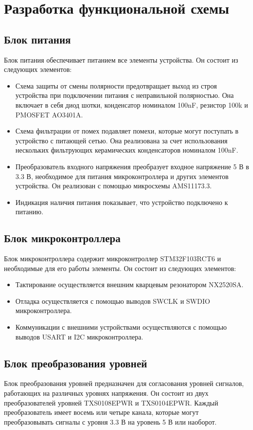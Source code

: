 \section{Разработка функциональной схемы}
\label{sec:func}

\subsection{Блок питания}
Блок питания обеспечивает питанием все элементы устройства. Он состоит из следующих элементов:
\begin{itemize}
    \item Схема защиты от смены полярности предотвращает выход из строя устройства при подключении питания с неправильной полярностью. Она включает в себя диод шотки, конденсатор номиналом 100nF, резистор 100k и PMOSFET AO3401A.
    \item Схема фильтрации от помех подавляет помехи, которые могут поступать в устройство с питающей сетью. Она реализована за счет использования нескольких фильтрующих керамических конденсаторов номиналом 100nF.
    \item Преобразователь входного напряжения преобразует входное напряжение 5 В в 3.3 В, необходимое для питания микроконтроллера и других элементов устройства. Он реализован с помощью микросхемы AMS11173.3.
    \item Индикация наличия питания показывает, что устройство подключено к питанию.
\end{itemize}

\subsection{Блок микроконтроллера}
Блок микроконтроллера содержит микроконтроллер STM32F103RCT6 и необходимые для его работы элементы. Он состоит из следующих элементов:
\begin{itemize}
    \item Тактирование осуществляется внешним кварцевым резонатором NX2520SA.
    \item Отладка осуществляется с помощью выводов SWCLK и SWDIO микроконтроллера.
    \item Коммуникации с внешними устройствами осуществляются с помощью выводов USART и I2C микроконтроллера.
\end{itemize}

\subsection{Блок преобразования уровней} 

Блок преобразования уровней предназначен для согласования уровней сигналов, работающих на различных уровнях напряжения. Он состоит из двух преобразователей уровней TXS0108EPWR и TXS0104EPWR. Каждый преобразователь имеет восемь или четыре канала, которые могут преобразовывать сигналы с уровня 3.3 В на уровень 5 В или наоборот.
